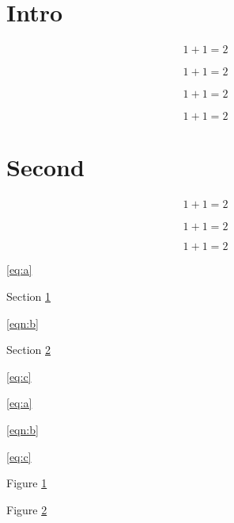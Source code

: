 


\section{Intro} \label{sec:intro}

\begin{align*}
1+1 = 2
\end{align*}

\begin{equation*}
1+1 = 2
\end{equation*}

\begin{align}
1+1 = 2
\end{align}

\begin{equation}
1+1 = 2
\end{equation}

\section{Second} \label{sec:second}

\begin{align} \label{eq:a}
1+1 = 2
\end{align}

\begin{figure}
\label{fig:a}
\end{figure}

\begin{equation} \label{eqn:b}
1+1 = 2
\end{equation}

\begin{equation}
\label{eq:c}
1+1 = 2
\end{equation}

\begin{figure}
\label{fig:b}
\end{figure}

\ref{eq:a}

Section \ref{sec:intro}

\ref{eqn:b}

Section \ref{sec:second}

\ref{eq:c}

\eqref{eq:a}

\eqref{eqn:b}

\eqref{eq:c}

Figure \ref{fig:a}

Figure \ref{fig:b}

\cite{Wooldridge_2002}

